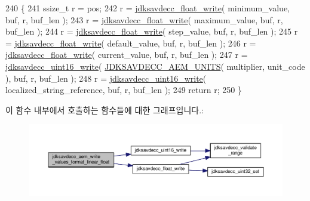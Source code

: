 \begin{DoxyCode}
240 \{
241     ssize\_t r = pos;
242     r = \hyperlink{group__endian_ga5a2f14797e18454da8a06d2d6c59855f}{jdksavdecc\_float\_write}( minimum\_value, buf, r, buf\_len );
243     r = \hyperlink{group__endian_ga5a2f14797e18454da8a06d2d6c59855f}{jdksavdecc\_float\_write}( maximum\_value, buf, r, buf\_len );
244     r = \hyperlink{group__endian_ga5a2f14797e18454da8a06d2d6c59855f}{jdksavdecc\_float\_write}( step\_value, buf, r, buf\_len );
245     r = \hyperlink{group__endian_ga5a2f14797e18454da8a06d2d6c59855f}{jdksavdecc\_float\_write}( default\_value, buf, r, buf\_len );
246     r = \hyperlink{group__endian_ga5a2f14797e18454da8a06d2d6c59855f}{jdksavdecc\_float\_write}( current\_value, buf, r, buf\_len );
247     r = \hyperlink{group__endian_ga4c0851ce17bde5306fdb04bfb5b75af1}{jdksavdecc\_uint16\_write}( \hyperlink{group__aem__descriptor_gae5f7498f6048b4dda1aca923b0eae0f6}{JDKSAVDECC\_AEM\_UNITS}( 
      multiplier, unit\_code ), buf, r, buf\_len );
248     r = \hyperlink{group__endian_ga4c0851ce17bde5306fdb04bfb5b75af1}{jdksavdecc\_uint16\_write}( localized\_string\_reference, buf, r, buf\_len );
249     \textcolor{keywordflow}{return} r;
250 \}
\end{DoxyCode}


이 함수 내부에서 호출하는 함수들에 대한 그래프입니다.\+:
\nopagebreak
\begin{figure}[H]
\begin{center}
\leavevmode
\includegraphics[width=350pt]{group__aem__descriptor_ga9edea2fd4295d1bfb549616ede0e0f27_cgraph}
\end{center}
\end{figure}


